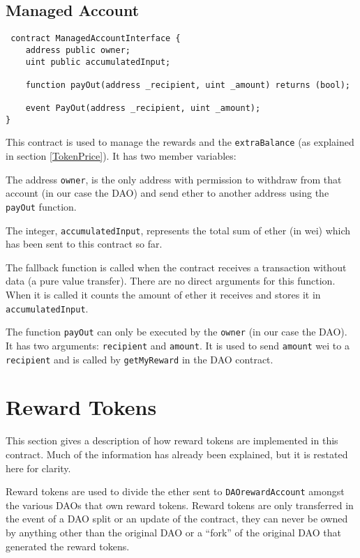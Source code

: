 \documentclass[9pt,oneside]{amsart}
\begin{document}
\subsection{Managed Account}
\begin{verbatim}
 contract ManagedAccountInterface {
    address public owner;
    uint public accumulatedInput;

    function payOut(address _recipient, uint _amount) returns (bool);

    event PayOut(address _recipient, uint _amount);
}
\end{verbatim}
\begin{multicols}{2}
This contract is used to manage the rewards and the \verb|extraBalance| (as explained in section \ref{TokenPrice}). It has two member variables:

The address \verb|owner|, is the only address with permission to withdraw from that account (in our case the DAO) and send ether to another address using the \verb|payOut| function.

The integer, \verb|accumulatedInput|, represents the total sum of ether (in wei) which has been sent to this contract so far.

The fallback function is called when the contract receives a transaction without data (a pure value transfer). There are no direct arguments for this function. When it is called it counts the amount of ether it receives and stores it in \verb|accumulatedInput|.

The function \verb|payOut| can only be executed by the \verb|owner| (in our case the DAO). It has two arguments: \verb|recipient| and \verb|amount|. It is used to send \verb|amount| wei to a \verb|recipient| and is called by \verb|getMyReward| in the DAO contract.

\section{Reward Tokens} \label{RewardToken}

This section gives a description of how reward tokens are implemented in this contract. Much of the information has already been explained, but it is restated here for clarity. 

Reward tokens are used to divide the ether sent to \verb|DAOrewardAccount| amongst the various DAOs that own reward tokens. Reward tokens are only transferred in the event of a DAO split or an update of the contract, they can never be owned by anything other than the original DAO or a “fork” of the original DAO that generated the reward tokens. 


\end{multicols}
\end{document}
